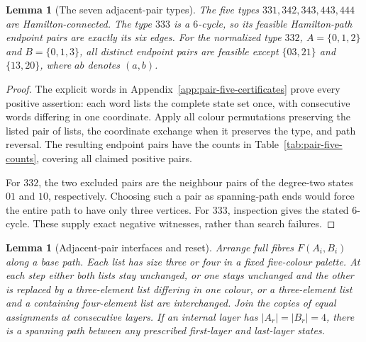 \documentclass[11pt]{article}
\newtheorem{lemma}[theorem]{Lemma}
\theoremstyle{remark}
\numberwithin{equation}{section}
\numberwithin{table}{section}
\begin{document}
\begin{lemma}[The seven adjacent-pair types]
\label{lem:pair-five-endpoints}
The five types $331,342,343,443,444$ are Hamilton-connected.
The type $333$ is a $6$-cycle, so its feasible Hamilton-path endpoint
pairs are exactly its six edges.  For the normalized type $332$,
$A=\{0,1,2\}$ and $B=\{0,1,3\}$, all distinct endpoint pairs are
feasible except $\{03,21\}$ and $\{13,20\}$, where $ab$ denotes
$(a,b)$.
\end{lemma}

\begin{proof}
The explicit words in Appendix~\ref{app:pair-five-certificates}
prove every positive assertion: each word
lists the complete state set once, with consecutive words differing in
one coordinate.  Apply all colour permutations preserving the listed
pair of lists, the coordinate exchange when it preserves the type, and
path reversal.  The resulting endpoint pairs have the counts in
Table~\ref{tab:pair-five-counts}, covering all claimed positive pairs.

For $332$, the two excluded pairs are the neighbour pairs of the
degree-two states $01$ and $10$, respectively.  Choosing such a pair
as spanning-path ends would force the entire path to have only three
vertices.  For $333$, inspection gives the stated $6$-cycle.  These
supply exact negative witnesses, rather than search failures.
\end{proof}



\begin{lemma}[Adjacent-pair interfaces and reset]
\label{lem:pair-five-reset}
Arrange full fibres $F(A_i,B_i)$ along a base path.  Each list has
size three or four in a fixed five-colour palette.  At each step either
both lists stay unchanged, or one stays unchanged and the other is
replaced by a three-element list differing in one colour, or a
three-element list and a containing four-element list are interchanged.
Join the copies of equal assignments at consecutive layers.  If an
internal layer has $|A_r|=|B_r|=4$, there is a spanning path between
any prescribed first-layer and last-layer states.
\end{lemma}
\end{document}

